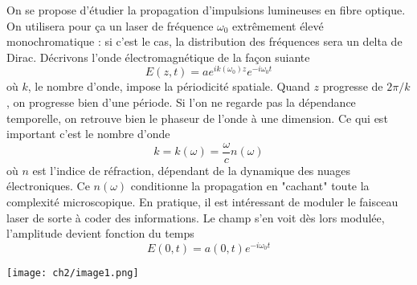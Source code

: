 On se propose d'étudier la propagation d'impulsions lumineuses en fibre optique. On utilisera 
pour ça un laser de fréquence $\omega_0$ extrêmement élevé monochromatique : si c'est le cas, 
la distribution des fréquences sera un delta de Dirac. Décrivons l'onde électromagnétique de 
la façon suiante
\begin{equation}
E(z,t) = ae^{ik(\omega_0)z}e^{-i\omega_0t}
\end{equation}
où $k$, le nombre d'onde, impose la périodicité spatiale. Quand $z$ progresse de $2\pi/k$, on 
progresse bien d'une période. Si l'on ne regarde pas la dépendance temporelle, on retrouve bien 
le phaseur de l'onde à une dimension. Ce qui est important c'est le nombre d'onde
\begin{equation}
k = k(\omega) = \frac{\omega}{c}n(\omega)
\end{equation}
où $n$ est l'indice de réfraction, dépendant de la dynamique des nuages électroniques. Ce $n
(\omega)$ conditionne la propagation en "cachant" toute la complexité microscopique. En pratique, 
il est intéressant de moduler le faisceau laser de sorte à coder des informations. Le champ 
s'en voit dès lors modulée, l'amplitude devient fonction du temps
\begin{equation}
E(0,t) = a(0,t)e^{-i\omega_0t}
\end{equation}
\begin{center}
\texttt{[image: ch2/image1.png]}
\end{center}

